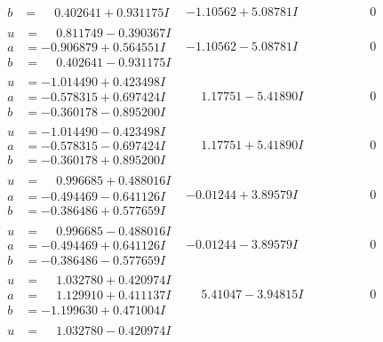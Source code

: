\documentclass[1p]{elsarticle_modified}
\theoremstyle{definition}
\begin{document}
$$\begin{array}{c|c|c}
\begin{aligned}
b &= \phantom{-}0.402641 + 0.931175 I\end{aligned}
 & -1.10562 + 5.08781 I & \phantom{-0.000000 } 0 \\ \hline\begin{aligned}
u &= \phantom{-}0.811749 - 0.390367 I \\
a &= -0.906879 + 0.564551 I \\
b &= \phantom{-}0.402641 - 0.931175 I\end{aligned}
 & -1.10562 - 5.08781 I & \phantom{-0.000000 } 0 \\ \hline\begin{aligned}
u &= -1.014490 + 0.423498 I \\
a &= -0.578315 + 0.697424 I \\
b &= -0.360178 - 0.895200 I\end{aligned}
 & \phantom{-}1.17751 - 5.41890 I & \phantom{-0.000000 } 0 \\ \hline\begin{aligned}
u &= -1.014490 - 0.423498 I \\
a &= -0.578315 - 0.697424 I \\
b &= -0.360178 + 0.895200 I\end{aligned}
 & \phantom{-}1.17751 + 5.41890 I & \phantom{-0.000000 } 0 \\ \hline\begin{aligned}
u &= \phantom{-}0.996685 + 0.488016 I \\
a &= -0.494469 - 0.641126 I \\
b &= -0.386486 + 0.577659 I\end{aligned}
 & -0.01244 + 3.89579 I & \phantom{-0.000000 } 0 \\ \hline\begin{aligned}
u &= \phantom{-}0.996685 - 0.488016 I \\
a &= -0.494469 + 0.641126 I \\
b &= -0.386486 - 0.577659 I\end{aligned}
 & -0.01244 - 3.89579 I & \phantom{-0.000000 } 0 \\ \hline\begin{aligned}
u &= \phantom{-}1.032780 + 0.420974 I \\
a &= \phantom{-}1.129910 + 0.411137 I \\
b &= -1.199630 + 0.471004 I\end{aligned}
 & \phantom{-}5.41047 - 3.94815 I & \phantom{-0.000000 } 0 \\ \hline\begin{aligned}
u &= \phantom{-}1.032780 - 0.420974 I \\

\end{aligned}
\end{array}$$
\end{document}

